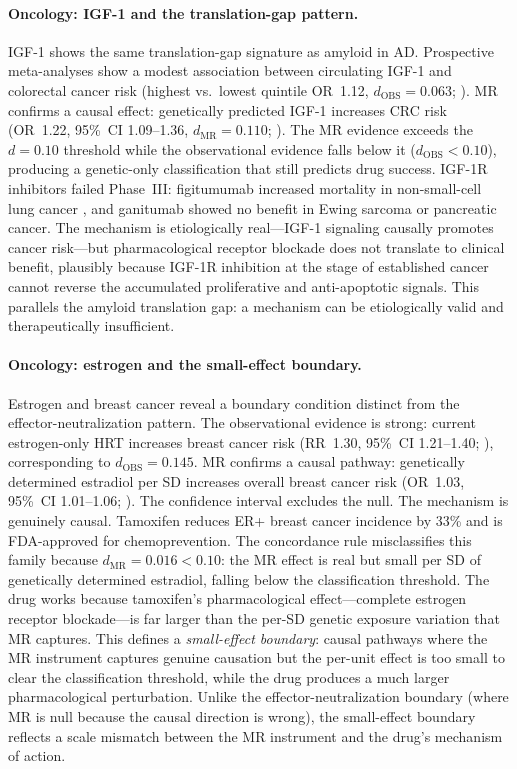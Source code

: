 \documentclass[11pt]{article}
\begin{document}
\paragraph{Oncology: IGF-1 and the translation-gap pattern.}
IGF-1 shows the same translation-gap signature as amyloid in AD. Prospective meta-analyses show a modest association between circulating IGF-1 and colorectal cancer risk (highest vs.\ lowest quintile OR~1.12, $d_{\text{OBS}} = 0.063$; \cite{rinaldi2019igfobs}). MR confirms a causal effect: genetically predicted IGF-1 increases CRC risk (OR~1.22, 95\%~CI 1.09--1.36, $d_{\text{MR}} = 0.110$; \cite{larsson2020igfcancer}). The MR evidence exceeds the $d = 0.10$ threshold while the observational evidence falls below it ($d_{\text{OBS}} < 0.10$), producing a genetic-only classification that still predicts drug success. IGF-1R inhibitors failed Phase~III: figitumumab increased mortality in non-small-cell lung cancer \cite{langer2014figitumumab}, and ganitumab showed no benefit in Ewing sarcoma \cite{juergens2023ganitumab} or pancreatic cancer. The mechanism is etiologically real---IGF-1 signaling causally promotes cancer risk---but pharmacological receptor blockade does not translate to clinical benefit, plausibly because IGF-1R inhibition at the stage of established cancer cannot reverse the accumulated proliferative and anti-apoptotic signals. This parallels the amyloid translation gap: a mechanism can be etiologically valid and therapeutically insufficient.

\paragraph{Oncology: estrogen and the small-effect boundary.}
Estrogen and breast cancer reveal a boundary condition distinct from the effector-neutralization pattern. The observational evidence is strong: current estrogen-only HRT increases breast cancer risk (RR~1.30, 95\%~CI 1.21--1.40; \cite{beral2003mws}), corresponding to $d_{\text{OBS}} = 0.145$. MR confirms a causal pathway: genetically determined estradiol per SD increases overall breast cancer risk (OR~1.03, 95\%~CI 1.01--1.06; \cite{shi2023estradiolBC}). The confidence interval excludes the null. The mechanism is genuinely causal. Tamoxifen reduces ER+ breast cancer incidence by 33\% \cite{cuzick2015tamoxifen} and is FDA-approved for chemoprevention. The concordance rule misclassifies this family because $d_{\text{MR}} = 0.016 < 0.10$: the MR effect is real but small per SD of genetically determined estradiol, falling below the classification threshold. The drug works because tamoxifen's pharmacological effect---complete estrogen receptor blockade---is far larger than the per-SD genetic exposure variation that MR captures. This defines a \emph{small-effect boundary}: causal pathways where the MR instrument captures genuine causation but the per-unit effect is too small to clear the classification threshold, while the drug produces a much larger pharmacological perturbation. Unlike the effector-neutralization boundary (where MR is null because the causal direction is wrong), the small-effect boundary reflects a scale mismatch between the MR instrument and the drug's mechanism of action.
\end{document}
